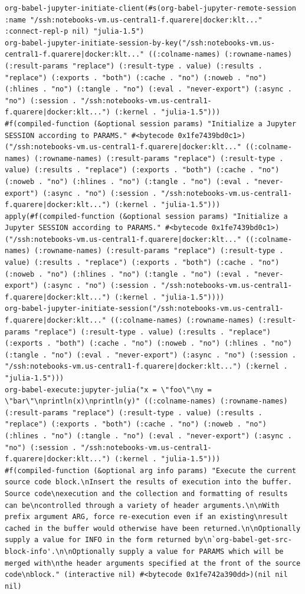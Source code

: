 \documentclass[11pt]{article}
\begin{document}
\begin{enumerate}
\begin{verbatim}
org-babel-jupyter-initiate-client(#s(org-babel-jupyter-remote-session :name "/ssh:notebooks-vm.us-central1-f.quarere|docker:klt..." :connect-repl-p nil) "julia-1.5")
org-babel-jupyter-initiate-session-by-key("/ssh:notebooks-vm.us-central1-f.quarere|docker:klt..." ((:colname-names) (:rowname-names) (:result-params "replace") (:result-type . value) (:results . "replace") (:exports . "both") (:cache . "no") (:noweb . "no") (:hlines . "no") (:tangle . "no") (:eval . "never-export") (:async . "no") (:session . "/ssh:notebooks-vm.us-central1-f.quarere|docker:klt...") (:kernel . "julia-1.5")))
#f(compiled-function (&optional session params) "Initialize a Jupyter SESSION according to PARAMS." #<bytecode 0x1fe7439bd0c1>)("/ssh:notebooks-vm.us-central1-f.quarere|docker:klt..." ((:colname-names) (:rowname-names) (:result-params "replace") (:result-type . value) (:results . "replace") (:exports . "both") (:cache . "no") (:noweb . "no") (:hlines . "no") (:tangle . "no") (:eval . "never-export") (:async . "no") (:session . "/ssh:notebooks-vm.us-central1-f.quarere|docker:klt...") (:kernel . "julia-1.5")))
apply(#f(compiled-function (&optional session params) "Initialize a Jupyter SESSION according to PARAMS." #<bytecode 0x1fe7439bd0c1>) ("/ssh:notebooks-vm.us-central1-f.quarere|docker:klt..." ((:colname-names) (:rowname-names) (:result-params "replace") (:result-type . value) (:results . "replace") (:exports . "both") (:cache . "no") (:noweb . "no") (:hlines . "no") (:tangle . "no") (:eval . "never-export") (:async . "no") (:session . "/ssh:notebooks-vm.us-central1-f.quarere|docker:klt...") (:kernel . "julia-1.5"))))
org-babel-jupyter-initiate-session("/ssh:notebooks-vm.us-central1-f.quarere|docker:klt..." ((:colname-names) (:rowname-names) (:result-params "replace") (:result-type . value) (:results . "replace") (:exports . "both") (:cache . "no") (:noweb . "no") (:hlines . "no") (:tangle . "no") (:eval . "never-export") (:async . "no") (:session . "/ssh:notebooks-vm.us-central1-f.quarere|docker:klt...") (:kernel . "julia-1.5")))
org-babel-execute:jupyter-julia("x = \"foo\"\ny = \"bar\"\nprintln(x)\nprintln(y)" ((:colname-names) (:rowname-names) (:result-params "replace") (:result-type . value) (:results . "replace") (:exports . "both") (:cache . "no") (:noweb . "no") (:hlines . "no") (:tangle . "no") (:eval . "never-export") (:async . "no") (:session . "/ssh:notebooks-vm.us-central1-f.quarere|docker:klt...") (:kernel . "julia-1.5")))
#f(compiled-function (&optional arg info params) "Execute the current source code block.\nInsert the results of execution into the buffer.  Source code\nexecution and the collection and formatting of results can be\ncontrolled through a variety of header arguments.\n\nWith prefix argument ARG, force re-execution even if an existing\nresult cached in the buffer would otherwise have been returned.\n\nOptionally supply a value for INFO in the form returned by\n`org-babel-get-src-block-info'.\n\nOptionally supply a value for PARAMS which will be merged with\nthe header arguments specified at the front of the source code\nblock." (interactive nil) #<bytecode 0x1fe742a390dd>)(nil nil nil)

\end{verbatim}
\end{enumerate}
\end{document}
